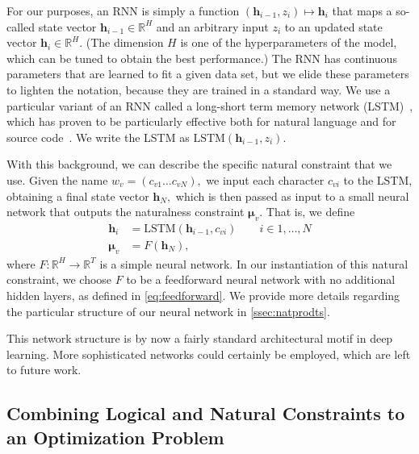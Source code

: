 \documentclass[sigplan,10pt,review,anonymous]{acmart}
\theoremstyle{plain}
\theoremstyle{remark}
\theoremstyle{definition}
\begin{document}
For our purposes, an RNN is simply a function $(\bm{h}_{i-1}, z_i) \mapsto \bm{h}_{i}$
that maps a so-called state vector $\bm{h}_{i-1} \in \mathbb{R}^H$
and an arbitrary input $z_i$ to an updated state vector $\bm{h}_{i}  \in \mathbb{R}^H$.
(The dimension $H$ is one of the hyperparameters of the model, which can be tuned 
to obtain the best performance.)
The RNN has continuous parameters that are learned to fit a given data set,
but we elide these parameters to lighten the notation, because they are trained in a standard way.
We use a particular variant of an RNN called a
long-short term memory network (LSTM)~\cite{hochreiter97},
which has proven to be particularly effective both for natural language
and for source code~\cite{sundermeyer2012,melis17,white2015,dam16}. We write the LSTM as 
$\text{LSTM}(\bm{h}_{i-1}, z_i).$

With this background, we can describe the specific natural constraint that we use.
Given the name $w_v = (c_{v1} \ldots c_{vN}),$ we input each character $c_{vi}$ to the LSTM,
obtaining a final state vector $\bm{h}_N,$ which is then passed as input to a small
neural network that outputs the naturalness constraint $\bm{\mu}_v$.
That is, we define
\begin{subequations}\label{eq:lstm}
\begin{align}
  \bm{h}_i & = \text{LSTM}(\bm{h}_{i-1}, c_{vi}) \qquad i \in 1, \ldots, N\\
  \bm{\mu}_v & = F(\bm{h}_N), \label{eq:lstmb}
\end{align}
\end{subequations}
where $F: \mathbb{R}^H \rightarrow \mathbb{R}^T$ is a simple neural network.
In our instantiation of this natural constraint, we choose $F$ to be a feedforward neural network with
no additional hidden layers, as defined in \eqref{eq:feedforward}.
We provide more details regarding the particular structure of our neural network in \cref{ssec:natprodts}.

This network structure 
is by now a fairly standard architectural motif in deep learning. More sophisticated networks could certainly
be employed, which are left to future work. 

\subsection{Combining Logical and Natural Constraints to an Optimization
Problem} \label{ssec:optimisation}
\end{document}
